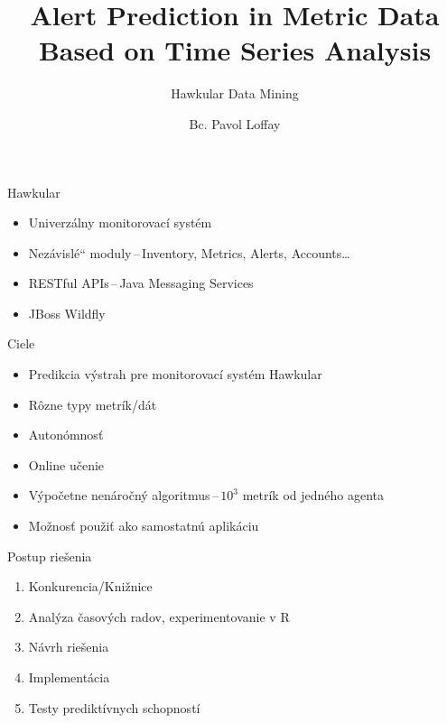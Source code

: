 \documentclass{beamer}
\title{Alert Prediction in Metric Data Based on Time Series Analysis} %
\subtitle{Hawkular Data Mining} %
\author{Bc. Pavol Loffay}
\newcommand\czuv[1]{\quotedblbase #1\textquotedblleft}
\begin{document}
\frame{\maketitle}



\begin{frame}{Hawkular}
  \begin{itemize}
    \item Univerzálny monitorovací systém
    \item \czuv{Nezávislé} moduly\,--\,Inventory, Metrics, Alerts, Accounts\dots
    \item RESTful APIs\,--\,Java Messaging Services
    \item JBoss Wildfly
  \end{itemize}
\end{frame}

\begin{frame}{Ciele}
  \begin{itemize}
    \item Predikcia výstrah pre monitorovací systém Hawkular
    \item Rôzne typy metrík/dát
    \item Autonómnosť
    \item Online učenie
    \item Výpočetne nenáročný algoritmus\,--\,$10^3$ metrík od jedného agenta
    \item Možnosť použiť ako samostatnú aplikáciu
  \end{itemize}
\end{frame}

\begin{frame}{Postup riešenia}
  \begin{enumerate}
    \item Konkurencia/Knižnice
    \item Analýza časových radov, experimentovanie v R
    \item Návrh riešenia
    \item Implementácia
    \item Testy prediktívnych schopností
  \end{enumerate}
\end{frame}
\end{document}

